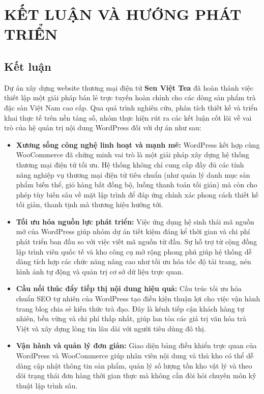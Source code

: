 \chapter*{KẾT LUẬN VÀ HƯỚNG PHÁT TRIỂN}

\section*{Kết luận}

Dự án xây dựng website thương mại điện tử \textbf{Sen Việt Tea} đã hoàn thành việc thiết lập một giải pháp bán lẻ trực tuyến hoàn chỉnh cho các dòng sản phẩm trà đặc sản Việt Nam cao cấp. Qua quá trình nghiên cứu, phân tích thiết kế và triển khai thực tế trên nền tảng số, nhóm thực hiện rút ra các kết luận cốt lõi về vai trò của hệ quản trị nội dung WordPress đối với dự án như sau:

\begin{itemize}
    \item \textbf{Xương sống công nghệ linh hoạt và mạnh mẽ:} WordPress kết hợp cùng WooCommerce đã chứng minh vai trò là một giải pháp xây dựng hệ thống thương mại điện tử tối ưu. Hệ thống không chỉ cung cấp đầy đủ các tính năng nghiệp vụ thương mại điện tử tiêu chuẩn (như quản lý danh mục sản phẩm biến thể, giỏ hàng bất đồng bộ, luồng thanh toán tối giản) mà còn cho phép tùy biến sâu về mặt lập trình để đáp ứng chính xác phong cách thiết kế tối giản, thanh tịnh mà thương hiệu hướng tới.
    
    \item \textbf{Tối ưu hóa nguồn lực phát triển:} Việc ứng dụng hệ sinh thái mã nguồn mở của WordPress giúp nhóm dự án tiết kiệm đáng kể thời gian và chi phí phát triển ban đầu so với việc viết mã nguồn từ đầu. Sự hỗ trợ từ cộng đồng lập trình viên quốc tế và kho công cụ mở rộng phong phú giúp hệ thống dễ dàng tích hợp các chức năng nâng cao như tối ưu hóa tốc độ tải trang, nén hình ảnh tự động và quản trị cơ sở dữ liệu trực quan.
    
    \item \textbf{Cầu nối thúc đẩy tiếp thị nội dung hiệu quả:} Cấu trúc tối ưu hóa chuẩn SEO tự nhiên của WordPress tạo điều kiện thuận lợi cho việc vận hành trang blog chia sẻ kiến thức trà đạo. Đây là kênh tiếp cận khách hàng tự nhiên, bền vững và chi phí thấp nhất, giúp lan tỏa các giá trị văn hóa trà Việt và xây dựng lòng tin lâu dài với người tiêu dùng đô thị.
    
    \item \textbf{Vận hành và quản lý đơn giản:} Giao diện bảng điều khiển trực quan của WordPress và WooCommerce giúp nhân viên nội dung và thủ kho có thể dễ dàng cập nhật thông tin sản phẩm, quản lý số lượng tồn kho vật lý và theo dõi trạng thái đơn hàng thời gian thực mà không cần đòi hỏi chuyên môn kỹ thuật lập trình sâu.
\end{itemize}

